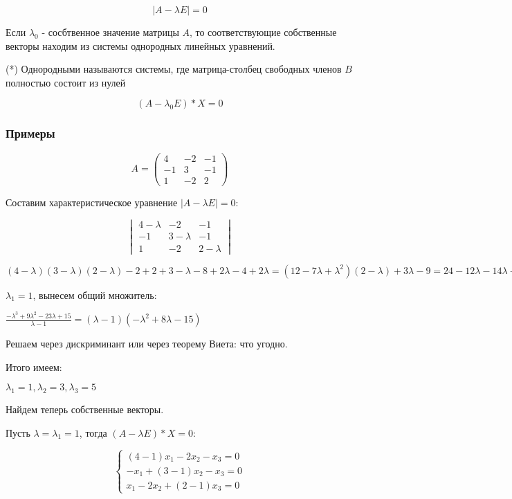 \documentclass{article}
\begin{document}
$$
|A - \lambda E| = 0
$$

Если $\lambda_0$ - сосбтвенное значение матрицы $A$, то соответствующие собственные векторы находим из системы однородных линейных уравнений.

(*) Однородными называются системы, где матрица-столбец свободных членов $B$ полностью состоит из нулей

$$
(A - \lambda_0 E ) * X = 0
$$

\subsubsection{Примеры}

$$A = \begin{pmatrix}
    4 & -2 & -1 \\
    -1 & 3 & -1 \\
    1 & -2 & 2
\end{pmatrix}
$$

Составим характеристическое уравнение $|A - \lambda E| = 0$:


$$
\begin{vmatrix}
    4-\lambda & -2 & -1 \\
    -1 & 3-\lambda & -1 \\
    1 & -2 & 2 - \lambda
\end{vmatrix}
$$

$(4 - \lambda)(3 - \lambda)(2 - \lambda) - 2 + 2 + 3 - \lambda - 8 + 2 \lambda - 4 + 2 \lambda = (12 - 7 \lambda + \lambda^2)(2 - \lambda) + 3\lambda - 9 = 24 - 12 \lambda - 14 \lambda + 7 \lambda^2 + 2 \lambda^2 - \lambda^3 + 3\lambda - 9 = -\lambda^3 - 6\lambda^2 - 23\lambda + 15 = 0$

$\lambda_1 = 1$, вынесем общий множитель:

$
\frac{-\lambda^3 + 9\lambda^2 - 23\lambda + 15}{\lambda - 1} = (\lambda - 1)(-\lambda^2 + 8\lambda - 15)
$

Решаем через дискриминант или через теорему Виета: что угодно.

Итого имеем:

$\lambda_1 = 1, \lambda_2 = 3, \lambda_3 = 5$

Найдем теперь собственные векторы.

Пусть $\lambda = \lambda_1 = 1$, тогда $(A - \lambda E) * X = 0$:

\begin{equation}
    \begin{cases}
        (4-1)x_1 - 2x_2 - x_3 = 0 \\
        -x_1 + (3 - 1)x_2 - x_3 = 0 \\
        x_1 - 2x_2 + (2 - 1)x_3 = 0
    \end{cases}
\end{equation}
\end{document}
